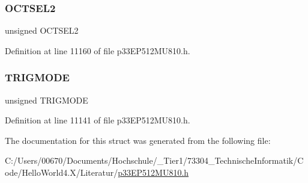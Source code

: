 \subsubsection{\texorpdfstring{O\+C\+T\+S\+E\+L2}{OCTSEL2}}
{\footnotesize\ttfamily unsigned O\+C\+T\+S\+E\+L2}



Definition at line 11160 of file p33\+E\+P512\+M\+U810.\+h.

\mbox{\label{structtag_o_c2_c_o_n1_b_i_t_s_a7a0057e0dca6e2663584b5b9e1da04c3}} 
\subsubsection{\texorpdfstring{T\+R\+I\+G\+M\+O\+DE}{TRIGMODE}}
{\footnotesize\ttfamily unsigned T\+R\+I\+G\+M\+O\+DE}



Definition at line 11141 of file p33\+E\+P512\+M\+U810.\+h.



The documentation for this struct was generated from the following file\+:\begin{DoxyCompactItemize}
\item 
C\+:/\+Users/00670/\+Documents/\+Hochschule/\+\_\+\+Tier1/73304\+\_\+\+Technische\+Informatik/\+Code/\+Hello\+World4.\+X/\+Literatur/\hyperlink{p33_e_p512_m_u810_8h}{p33\+E\+P512\+M\+U810.\+h}\end{DoxyCompactItemize}
